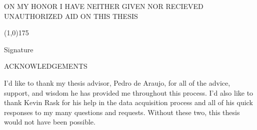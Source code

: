 \newpage{}

\vspace*{7cm}
\begin{changemargin}{1.75cm}{1.75cm}
  ON MY HONOR I HAVE NEITHER GIVEN NOR RECIEVED UNAUTHORIZED AID ON THIS THESIS
\end{changemargin}
\vspace{7cm}
\begin{changemargin}{9cm}{1.75cm}
  \begin{center}
    \line(1,0){175}
  \end{center}
  \vspace{-.5cm}
  Signature
\end{changemargin}

\newpage{}

\begin{center}
  \LARGE ACKNOWLEDGEMENTS
\end{center}

I'd like to thank my thesis advisor, Pedro de Araujo, for all of the advice, support, and wisdom he has provided me throughout this process. I'd also like to thank Kevin Rask for his help in the data acquisition process and all of his quick responses to my many questions and requests. Without these two, this thesis would not have been possible. 

\newpage{}

\thispagestyle{plain}
\tableofcontents

\newpage
